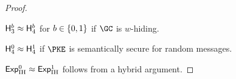 \begin{proof}
\begin{claim}\label{clm:index-hiding-hyb34}
${\Hyb_3^b\approx\Hyb_4^b}$ for ${b\in{\{0,1\}}}$
if $\GC$ is $w$-hiding.
\end{claim}

\begin{claim}\label{clm:index-hiding-hyb4}
${\Hyb_4^0\approx\Hyb_4^1}$
if $\PKE$ is semantically secure for random messages.
\end{claim}

\noindent
${\ExpIH{0}\approx\ExpIH{1}}$ follows from a hybrid argument.
\end{proof}
